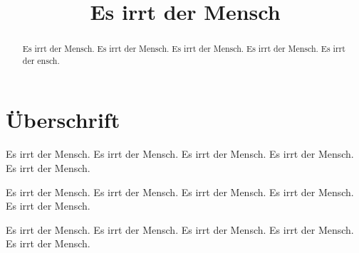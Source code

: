 \documentclass[a4paper,10pt, ngerman]{scrartcl}
\title{Es irrt der Mensch}
\author{}
\begin{document}
\maketitle

\begin{abstract}
\sffamily
Es irrt der Mensch. Es irrt der Mensch. Es irrt der Mensch. Es irrt der Mensch. Es irrt der ensch.
\end{abstract}

\section{Überschrift}

Es irrt der Mensch. Es irrt der Mensch. Es irrt der Mensch. Es irrt der Mensch. Es irrt der Mensch.

Es irrt der Mensch. Es irrt der Mensch. Es irrt der Mensch. Es irrt der Mensch. Es irrt der Mensch.

Es irrt der Mensch. Es irrt der Mensch. Es irrt der Mensch. Es irrt der Mensch. Es irrt der Mensch.
\end{document}

